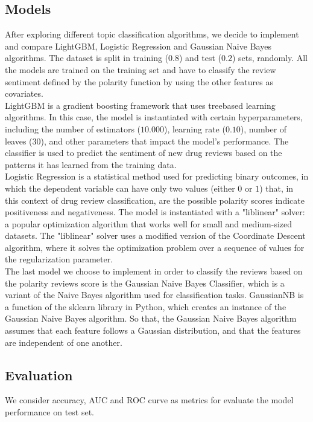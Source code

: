 \documentclass[10pt, a4paper, twocolumn]{article}
\begin{document}
        \subsection{Models}
        After exploring different topic classification algorithms, we decide to implement and compare LightGBM, Logistic Regression and Gaussian Naive Bayes algorithms.
        The dataset is split in training ($0.8$) and test ($0.2$) sets, randomly. All the models are trained on the training set and have to classify the review sentiment defined by the polarity function by using the other features as covariates.\\
        LightGBM is a gradient boosting framework that uses treebased learning algorithms. In this case, the model is instantiated with certain hyperparameters, including the number of estimators ($10.000$), learning rate ($0.10$), number of leaves ($30$), and other parameters that impact the model's performance. The classifier is used to predict the sentiment of new drug reviews based on the patterns it has learned from the training data.\\
        Logistic Regression is a statistical method used for predicting binary outcomes, in which the dependent variable can have only two values (either $0$ or $1$) that, in this context of drug review classification, are the possible polarity scores indicate positiveness and negativeness. The model is instantiated with a "liblinear" solver: a popular optimization algorithm that works well for small and medium-sized datasets. The "liblinear" solver uses a modified version of the Coordinate Descent algorithm, where it solves the optimization problem over a sequence of values for the regularization parameter.\\
        The last model we choose to implement in order to classify the reviews based on the polarity reviews score is the Gaussian Naive Bayes Classifier, which is a variant of the Naive Bayes algorithm used for classification tasks. GaussianNB is a function of the sklearn library in Python, which creates an instance of the Gaussian Naive Bayes algorithm. So that, the Gaussian Naive Bayes algorithm assumes that each feature follows a Gaussian distribution, and that the features are independent of one another.
        
        \subsection{Evaluation}
        We consider accuracy, AUC and ROC curve as metrics for evaluate the model performance on test set. 
        
\end{document}
